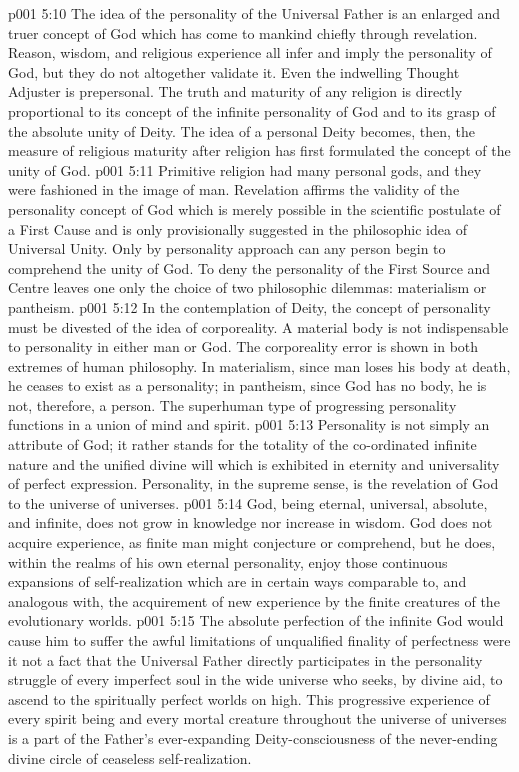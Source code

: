 \vs p001 5:10 \pc The idea of the personality of the Universal Father is an enlarged and truer concept of God which has come to mankind chiefly through revelation. Reason, wisdom, and religious experience all infer and imply the personality of God, but they do not altogether validate it. Even the indwelling Thought Adjuster is prepersonal. The truth and maturity of any religion is directly proportional to its concept of the infinite personality of God and to its grasp of the absolute unity of Deity. The idea of a personal Deity becomes, then, the measure of religious maturity after religion has first formulated the concept of the unity of God.
\vs p001 5:11 Primitive religion had many personal gods, and they were fashioned in the image of man. Revelation affirms the validity of the personality concept of God which is merely possible in the scientific postulate of a First Cause and is only provisionally suggested in the philosophic idea of Universal Unity. Only by personality approach can any person begin to comprehend the unity of God. To deny the personality of the First Source and Centre leaves one only the choice of two philosophic dilemmas: materialism or pantheism.
\vs p001 5:12 In the contemplation of Deity, the concept of personality must be divested of the idea of corporeality. A material body is not indispensable to personality in either man or God. The corporeality error is shown in both extremes of human philosophy. In materialism, since man loses his body at death, he ceases to exist as a personality; in pantheism, since God has no body, he is not, therefore, a person. The superhuman type of progressing personality functions in a union of mind and spirit.
\vs p001 5:13 \pc Personality is not simply an attribute of God; it rather stands for the totality of the co\hyp{}ordinated infinite nature and the unified divine will which is exhibited in eternity and universality of perfect expression. Personality, in the supreme sense, is the revelation of God to the universe of universes.
\vs p001 5:14 \pc God, being eternal, universal, absolute, and infinite, does not grow in knowledge nor increase in wisdom. God does not acquire experience, as finite man might conjecture or comprehend, but he does, within the realms of his own eternal personality, enjoy those continuous expansions of self\hyp{}realization which are in certain ways comparable to, and analogous with, the acquirement of new experience by the finite creatures of the evolutionary worlds.
\vs p001 5:15 The absolute perfection of the infinite God would cause him to suffer the awful limitations of unqualified finality of perfectness were it not a fact that the Universal Father directly participates in the personality struggle of every imperfect soul in the wide universe who seeks, by divine aid, to ascend to the spiritually perfect worlds on high. This progressive experience of every spirit being and every mortal creature throughout the universe of universes is a part of the Father’s ever\hyp{}expanding Deity\hyp{}consciousness of the never\hyp{}ending divine circle of ceaseless self\hyp{}realization.
